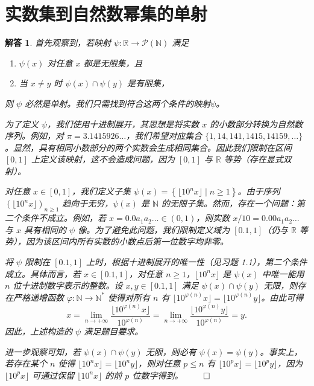 \documentclass[12pt,UTF8]{ctexbook}
\theoremstyle{exercisestyle}
\theoremstyle{solutionstyle}
\newtheorem*{solution*}{解答}
\newenvironment{solution}
  {\begin{solution*}}
  {\hfill\ensuremath{\qed}\end{solution*}}
\begin{document}
\section{实数集到自然数幂集的单射}
\begin{solution}
首先观察到，若映射 $\psi : \mathbb{R} \to \mathcal{P}(\mathbb{N})$ 满足 
\begin{enumerate}[label=\arabic*.]
    \item $\psi(x)$ 对任意 $x$ 都是无限集，且
    \item 当 $x \neq y$ 时 $\psi(x) \cap \psi(y)$ 是有限集，
\end{enumerate}
则 $\psi$ 必然是单射。我们只需找到符合这两个条件的映射$\psi$。

为了定义 $\psi$，我们使用十进制展开，其思想是将实数 $x$ 的小数部分转换为自然数序列。例如，对 $\pi = 3.1415926\ldots$，我们希望对应集合 $\{1, 14, 141, 1415, 14159, \ldots\}$。显然，具有相同小数部分的两个实数会生成相同集合。因此我们限制在区间 $[0, 1]$ 上定义该映射，这不会造成问题，因为 $[0,1]$ 与 $\mathbb{R}$ 等势（存在显式双射）。

对任意 $x \in [0,1]$，我们定义子集 $\psi(x) = \left\{ \lfloor10^n x\rfloor \mid n \geq 1 \right\}$。由于序列 $(\lfloor10^n x\rfloor)_{n \geq 1}$ 趋向于无穷，$\psi(x)$ 是 $\mathbb{N}$ 的无限子集。然而，存在一个问题：第二个条件不成立。例如，若 $x = 0.0a_1a_2\ldots \in (0,1)$，则实数 $x/10 = 0.00a_1a_2\ldots$ 与 $x$ 具有相同的 $\psi$ 像。为了避免此问题，我们限制定义域为 $[0.1, 1]$（仍与 $\mathbb{R}$ 等势），因为该区间内所有实数的小数点后第一位数字均非零。

将 $\psi$ 限制在 $[0.1, 1]$ 上时，根据十进制展开的唯一性（见习题 1.1），第二个条件成立。具体而言，若 $x \in [0.1, 1]$，对任意 $n \geq 1$，$\lfloor10^n x\rfloor$ 是 $\psi(x)$ 中唯一能用 $n$ 位十进制数字表示的整数。设 $x, y \in [0.1, 1]$ 满足 $\psi(x) \cap \psi(y)$ 无限，则存在严格递增函数 $\varphi : \mathbb{N} \to \mathbb{N}^*$ 使得对所有 $n$ 有 $\lfloor10^{\varphi(n)}x\rfloor = \lfloor10^{\varphi(n)}y\rfloor$。由此可得
$$
x = \lim_{n \to +\infty} \frac{\lfloor10^{\varphi(n)}x\rfloor}{10^{\varphi(n)}} = \lim_{n \to +\infty} \frac{\lfloor10^{\varphi(n)}y\rfloor}{10^{\varphi(n)}} = y.
$$
因此，上述构造的 $\psi$ 满足题目要求。

进一步观察可知，若 $\psi(x) \cap \psi(y)$ 无限，则必有 $\psi(x) = \psi(y)$。事实上，若存在某个 $n$ 使得 $\lfloor10^n x\rfloor = \lfloor10^n y\rfloor$，则对任意 $p \leq n$ 有 $\lfloor10^p x\rfloor = \lfloor10^p y\rfloor$，因为 $\lfloor10^p x\rfloor$ 可通过保留 $\lfloor10^n x\rfloor$ 的前 $p$ 位数字得到。
\end{solution}
\end{document}
